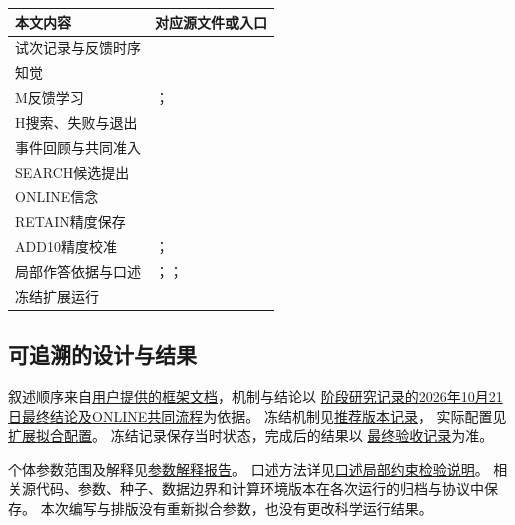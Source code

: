 \documentclass[11pt,a4paper]{article}
\numberwithin{equation}{section}
\begin{document}
{\small
\begin{longtable}{L{3.4cm}L{11.5cm}}
\toprule
本文内容 & 对应源文件或入口\\
\midrule\endhead
试次记录与反馈时序 & \\
知觉 & \\
M反馈学习 & ；\\
H搜索、失败与退出 & \\
事件回顾与共同准入 & \\
SEARCH候选提出 & \\
ONLINE信念 & \\
RETAIN精度保存 & \\
ADD10精度校准 & ；\\
局部作答依据与口述 & ；；\\
冻结扩展运行 & \\
\bottomrule
\end{longtable}}

\subsection{可追溯的设计与结果}
叙述顺序来自\href{model_clean_logic.docx}{用户提供的框架文档}，机制与结论以
\href{model_0923_research_progress_20261018.md}{阶段研究记录的2026年10月21日最终结论及ONLINE共同流程}为依据。
冻结机制见\href{../../../../results/model_0923/finalization_recommendation_20261021_v1/recommendation.json}{推荐版本记录}，
实际配置见\href{../../../../configs/shared/model0923_finalization_extension_fit.yaml}{扩展拟合配置}。
冻结记录保存当时状态，完成后的结果以
\href{../../../../results/model_0923/finalization_completion_audit_20261021_v1/completion.json}{最终验收记录}为准。

个体参数范围及解释见\href{../../../../results/model_0923/finalization_interpretation_20261021_v1/index.html}{参数解释报告}。
口述方法详见\href{model_0923_oral_constraints.md}{口述局部约束检验说明}。
相关源代码、参数、种子、数据边界和计算环境版本在各次运行的归档与协议中保存。
本次编写与排版没有重新拟合参数，也没有更改科学运行结果。
\end{document}
